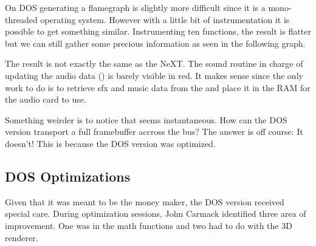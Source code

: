 On DOS generating a flamegraph is slightly more difficult since it is a mono-threaded operating system. However with a little bit of instrumentation it is possible to get something similar. Instrumenting ten functions, the result is flatter but we can still gather some precious information as seen in the following graph.\\
\par
\vspace{4mm}
\par
The result is not exactly the same as the NeXT. The sound routine in charge of updating the audio data () is barely visible in red. It makes sense since the only work to do is to retrieve sfx and music data from the  and place it in the RAM for the audio card to use.\\
\par
 Something weirder is to notice that  seems instantaneous. How can the DOS version transport a full framebuffer accross the bus? The answer is off course: It doesn't! This is because the DOS version was optimized.\\
\par


\subsection{DOS Optimizations}
Given that it was meant to be the money maker, the DOS version received special care. During optimization sessions, John Carmack identified three area of improvement. One was in the math functions and two had to do with the 3D renderer.\\
 \par
\par




